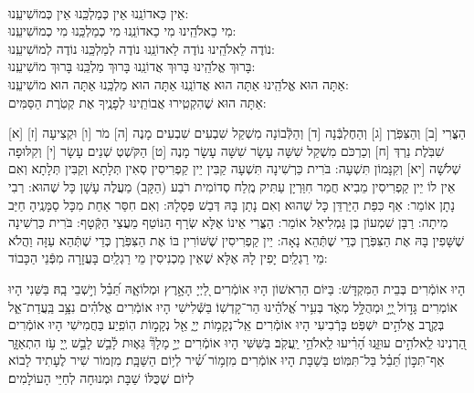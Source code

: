\documentclass[twoside, openany, parskip=half, 11pt]{book}
\begin{document}
\shabbossimshalom


\tachanunim

\\

\fullkaddish




\label{einkelokeinu}
 \hfill אֵין כַּאדוֹנֵֽנוּ \hfill אֵין כְּמַלְכֵּֽנוּ \hfill אֵין כְּמוֹשִׁיעֵֽנוּ:\\ 
מִי כֵאלֹהֵֽינוּ \hfill	מִי כַאדוֹנֵֽנוּ \hfill	מִי כְמַלְכֵּֽנוּ \hfill	מִי כְמוֹשִׁיעֵֽנוּ:\\ 
נוֹדֶה לֵאלֹהֵֽינוּ \hfill נוֹדֶה לַאדוֹנֵֽנוּ \hfill נוֹדֶה לְמַלְכֵּֽנוּ \hfill נוֹדֶה לְמוֹשִׁיעֵֽנוּ:\\ 
בָּרוּךְ אֱלֹהֵֽינוּ \hfill בָּרוּךְ אֲדוֹנֵֽנוּ \hfill בָּרוּךְ מַלְכֵּֽנוּ \hfill בָּרוּךְ מוֹשִׁיעֵֽנוּ:\\ 
אַתָּה הוּא אֱלֹהֵֽינוּ  אַתָּה הוּא אֲדוֹנֵֽנוּ  אַתָּה הוּא מַלְכֵּֽנוּ  אַתָּה הוּא מוֹשִׁיעֵֽנוּ:\\ 
 אַתָּה הוּא שֶׁהִקְטִֽירוּ אֲבוֹתֵֽינוּ לְפָנֶֽיךָ אֶת קְטֹֽרֶת הַסַּמִּים:

\nextpage

 [א] הַצֳּרִי [ב] וְהַצִּפֹּֽרֶן [ג] וְהַחֶלְבְּֿנָה [ד] וְהַלְּֿבוֹנָה מִשְׁקַל שִׁבְעִים שִׁבְעִים מָנֶה [ה] מֹר [ו] וּקְצִיעָה [ז] שִׁבֹּֽלֶת נֵרְדְּ [ח] וְכַרְכֹּם מִשְׁקַל שִׁשָּׁה עָשָׂר שִׁשָּׁה עָשָׂר מָנֶה [ט] הַקֹּשְׁטְ שְׁנֵים עָשָׂר [י] וְקִלּוּפָה שְׁלֹשָׁה [יא] וְקִנָּמוֹן תִּשְׁעָה: בֹּרִית כַּרְשִׁינָה תִּשְׁעָה קַבִּין יֵין קַפְרִיסִין סְאִין תְּלָתָא וְקַבִּין תְּלָתָא וְאִם אֵין לוֹ יֵין קַפְרִיסִין מֵבִיא חֲמַר חִוַּרְיָן עַתִּיק מֶֽלַח סְדוֹמִית רֹבַע (הַקָּב) מַעֲלֶה עָשָׁן כָּל שֶׁהוּא: רְבִי נָתָן אוֹמֵר: אַף כִּפַּת הַיַּרְדֵּן כָּל שֶׁהוּא וְאִם נָתַן בָּהּ דְּבַשׁ פְּסָלָהּ: וְאִם חִסַּר אַחַת מִכָּל סַמָּנֶֽיהָ חַיַּב מִיתָה: רַבָּן שִׁמְעוֹן בֶּן גַּמְלִיאֵל אוֹמֵר: הַצֳּרִי אֵינוֹ אֶלָּא שְׂרָף הַנּוֹטֵף מֵעֲצֵי הַקְּֿטָף: בֹּרִית כַּרְשִׁינָה שֶׁשָּׁפִין בָּהּ אֶת הַצִּפֹּֽרֶן כְּדֵי שֶׁתְּֿהֵא נָאָה: יֵין קַפְרִיסִין שֶׁשּׁוֹרִין בּוֹ אֶת הַצִּפֹּֽרֶן כְּדֵי שֶׁתְּֿהֵא עַזָּה וַהֲלֹא מֵי רַגְלַֽיִם יָפִין לָהּ אֶלָּא שֶׁאֵין מַכְנִיסִין מֵי רַגְלַֽיִם בָּעֲזָרָה מִפְּֿנֵי הַכָּבוֹד:

\vspace{-.3\baselineskip}
 הָיוּ אוֹמְֿרִים בְּבֵית הַמִּקְדָּשׁ: 
 בַּיּוֹם הַרִאשׁוֹן הָיוּ אוֹמְֿרִים לַ֭יְיָ הָאָ֣רֶץ וּמְלוֹאָ֑הּ תֵּ֝בֵ֗ל וְי֣שְׁבֵי בָֽהּ׃
בַּשֵּׁנִי הָיוּ אוֹמְרִים גָּד֣וֹל ֖יְיָ֣ וּמְהֻלָּ֣ל מְאֹ֑ד בְּעִ֥יר אֱ֝לֹהֵ֗ינוּ הַר־קָדְשֽׁוֹ׃
בַּשְּֿׁלִישִׁי הָיוּ אוֹמְֿרִים אֱלֹהִ֗ים נִצָּ֥ב בַּֽעֲדַת־אֵ֑ל בְּקֶ֖רֶב אֱלֹהִ֣ים יִשְׁפֹּֽט׃ בָּרְֿבִיעִי הָיוּ אוֹמְֿרִים אֵֽל־נְקָמ֥וֹת יְיָ֑ אֵ֖ל נְקָמ֣וֹת הֽוֹפִֽיַע׃ בַּחֲמִישִׁי הָיוּ אוֹמְֿרִים הַ֭רְנִינוּ לֵֽאלֹהִ֣ים עוּזֵּ֑נוּ הָ֝רִ֗יעוּ לֵֽאלֹהֵ֥י יַֽעֲקֹֽב׃ בַּשִּׁשִּׁי הָיוּ אוֹמְֿרִים יְיָ֣ מָלָךְ֘ גֵּא֢וּת לָ֫בֵ֥שׁ לָבֵ֣שׁ יְ֖יָ עֹ֥ז הִתְאַזָּ֑ר אַף־תִּכּ֣וֹן תֵּ֝בֵ֗ל בַּל־תִּמּֽוֹט׃ בַּשַׁבָּת הָיוּ אוֹמְֿרִים מִזְמ֥וֹר שִׁ֝֗יר לְי֥וֹם הַשַּׁבָּֽת׃ מִזְמוֹר שִׁיר לֶעָתִיד לָבוֹא לְיוֹם שֶׁכֻּלּוֹ שַׁבָּת וּמְנוּחָה לְחַיֵּי הָעוֹלָמִים׃
\end{document}
